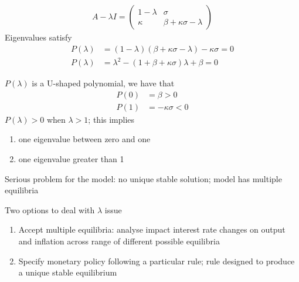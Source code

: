 \documentclass{beamer}
\begin{document}
\begin{frame}
  \begin{align}
  A-\lambda I = \begin{pmatrix}
    1-\lambda & \sigma \\
    \kappa    & \beta + \kappa \sigma - \lambda
  \end{pmatrix}
 \end{align}
 Eigenvalues satisfy
\begin{align} 
    P(\lambda) &=(1-\lambda)(\beta+\kappa\sigma-\lambda)-\kappa\sigma=0\\ \nonumber
    P(\lambda) &= \lambda^2  -(1+\beta+\kappa\sigma)\lambda+\beta=0
\end{align} 
\end{frame}

\begin{frame} $P(\lambda)$ is a U-shaped polynomial, we have that
 \begin{align}
   P(0)&=\beta>0\\
   P(1)&=-\kappa \sigma <0
 \end{align}
 $P(\lambda)>0$ when $\lambda>1$; this implies
 \begin{enumerate}
   \item one eigenvalue between zero and one 
   \item one eigenvalue greater than 1
 \end{enumerate}
\medskip
Serious problem for the model: no unique stable solution; model has multiple equilibria
\end{frame}

\begin{frame}
  Two options to deal with $\lambda$ issue
\begin{enumerate}
  \item Accept multiple equilibria: analyse impact interest rate changes on output and inflation across range of different possible equilibria
  \item Specify monetary policy following a particular rule; rule designed to produce a unique stable equilibrium
\end{enumerate}
\end{frame}
\end{document}
